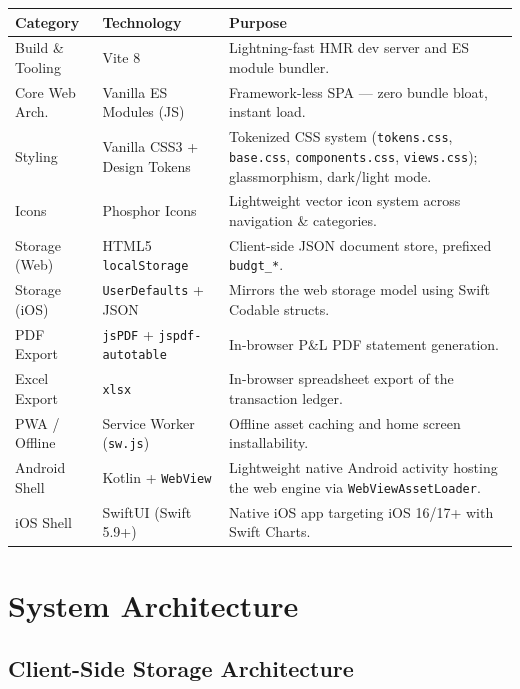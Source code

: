 \documentclass[12pt, a4paper]{article}
\begin{document}
\begin{longtable}{L{3.5cm} L{4.5cm} L{6.5cm}}
  \toprule
  \textbf{Category} & \textbf{Technology} & \textbf{Purpose} \\
  \midrule
  \endhead
  Build \& Tooling & Vite 8 & Lightning-fast HMR dev server and ES module bundler. \\[4pt]
  Core Web Arch. & Vanilla ES Modules (JS) & Framework-less SPA --- zero bundle bloat, instant load. \\[4pt]
  Styling & Vanilla CSS3 + Design Tokens & Tokenized CSS system (\texttt{tokens.css}, \texttt{base.css}, \texttt{components.css}, \texttt{views.css}); glassmorphism, dark/light mode. \\[4pt]
  Icons & Phosphor Icons & Lightweight vector icon system across navigation \& categories. \\[4pt]
  Storage (Web) & HTML5 \texttt{localStorage} & Client-side JSON document store, prefixed \texttt{budgt\_*}. \\[4pt]
  Storage (iOS) & \texttt{UserDefaults} + JSON & Mirrors the web storage model using Swift Codable structs. \\[4pt]
  PDF Export & \texttt{jsPDF} + \texttt{jspdf-autotable} & In-browser P\&L PDF statement generation. \\[4pt]
  Excel Export & \texttt{xlsx} & In-browser spreadsheet export of the transaction ledger. \\[4pt]
  PWA / Offline & Service Worker (\texttt{sw.js}) & Offline asset caching and home screen installability. \\[4pt]
  Android Shell & Kotlin + \texttt{WebView} & Lightweight native Android activity hosting the web engine via \texttt{WebViewAssetLoader}. \\[4pt]
  iOS Shell & SwiftUI (Swift 5.9+) & Native iOS app targeting iOS 16/17+ with Swift Charts. \\
  \bottomrule
\end{longtable}

\section{System Architecture}

\subsection{Client-Side Storage Architecture}
\end{document}
